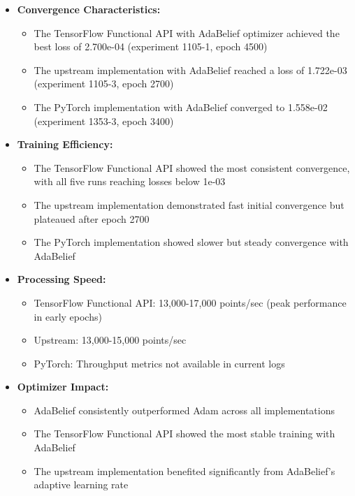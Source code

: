\documentclass[10pt,journal,compsoc,onecolumn]{IEEEtran}
\begin{document}
\begin{itemize}
    \item \textbf{Convergence Characteristics:}
    \begin{itemize}
        \item The TensorFlow Functional API with AdaBelief optimizer achieved the best loss of 2.700e-04 (experiment 1105-1, epoch 4500)
        \item The upstream implementation with AdaBelief reached a loss of 1.722e-03 (experiment 1105-3, epoch 2700)
        \item The PyTorch implementation with AdaBelief converged to 1.558e-02 (experiment 1353-3, epoch 3400)
    \end{itemize}
    
    \item \textbf{Training Efficiency:}
    \begin{itemize}
        \item The TensorFlow Functional API showed the most consistent convergence, with all five runs reaching losses below 1e-03
        \item The upstream implementation demonstrated fast initial convergence but plateaued after epoch 2700
        \item The PyTorch implementation showed slower but steady convergence with AdaBelief
    \end{itemize}
    
    \item \textbf{Processing Speed:}
    \begin{itemize}
        \item TensorFlow Functional API: 13,000-17,000 points/sec (peak performance in early epochs)
        \item Upstream: 13,000-15,000 points/sec
        \item PyTorch: Throughput metrics not available in current logs
    \end{itemize}
    
    \item \textbf{Optimizer Impact:}
    \begin{itemize}
        \item AdaBelief consistently outperformed Adam across all implementations
        \item The TensorFlow Functional API showed the most stable training with AdaBelief
        \item The upstream implementation benefited significantly from AdaBelief's adaptive learning rate
    \end{itemize}
\end{itemize}
\end{document}
